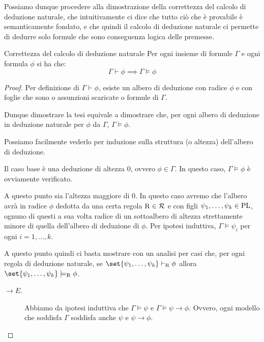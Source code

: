 Possiamo dunque procedere alla dimostrazione della correttezza del calcolo di deduzione naturale, che intuitivamente ci dice che tutto ciò che è provabile è semanticamente fondato, e che quindi il calcolo di deduzione naturale ci permette di dedurre solo formule che sono conseguenza logica delle premesse.

\begin{theorem}{Correttezza del calcolo di deduzione naturale}
  Per ogni insieme di formule \(\Gamma\) e ogni formula \(\phi\) si ha che:
  \[\Gamma \vdash \phi \implies \Gamma \models \phi\]
\end{theorem}

\begin{proof}

  Per definizione di \(\Gamma\vdash\phi\), esiste un albero di deduzione con radice \(\phi\) e con foglie che sono o assunzioni scaricate o formule di \(\Gamma\).

  Dunque dimostrare la tesi equivale a dimostrare che, per ogni albero di deduzione in deduzione naturale per \(\phi\) da \(\Gamma\), \(\Gamma\models\phi\).

  Possiamo facilmente vederlo per induzione sulla struttura (o altezza) dell'albero di deduzione.
  
  Il caso base è una deduzione di altezza \(0\), ovvero \(\phi \in \Gamma\). In questo caso, \(\Gamma\models\phi\) è ovviamente verificato.

  A questo punto sia l'altezza maggiore di \(0\). In questo caso avremo che l'albero avrà in radice \(\phi\) dedotta da una certa regola \(\operatorname{R} \in \mathcal{R}\) e con figli \(\psi_1,\ldots,\psi_k \in \operatorname{PL}\), ognuno di questi a sua volta radice di un sottoalbero di altezza strettamente minore di quella dell'albero di deduzione di \(\phi\). Per ipotesi induttiva, \(\Gamma\models\psi_i\) per ogni \(i=1,\ldots,k\).

  A questo punto quindi ci basta mostrare con un analisi per casi che, per ogni regola di deduzione naturale, se \(\set{\psi_1,\ldots,\psi_k} \vdash_{\Rule} \phi\) allora \(\set{\psi_1,\ldots,\psi_k} \models_{\Rule} \phi\).

  \begin{description}
    \item[\(\to E\).] Abbiamo da ipotesi induttiva che \(\Gamma\models\psi\) e \(\Gamma\models\psi\to\phi\).
      Ovvero, ogni modello che soddisfa \(\Gamma\) soddisfa anche \(\psi\) e \(\psi\to\phi\).
      

\end{description}
\end{proof}
